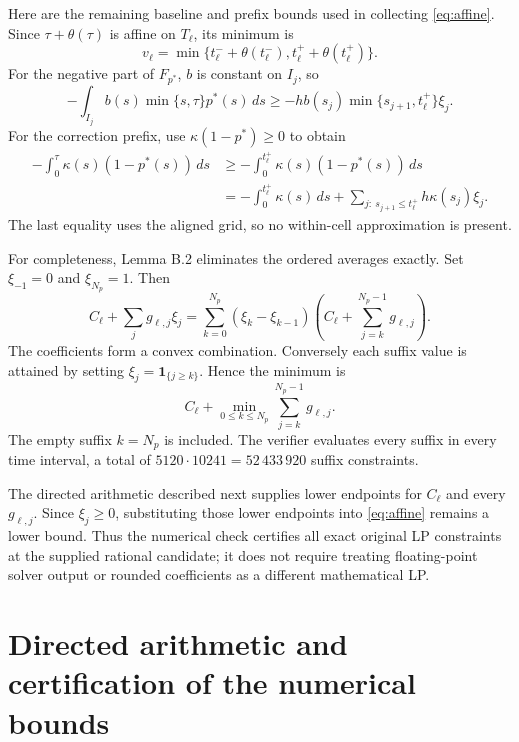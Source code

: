 \documentclass[11pt,a4paper]{article}
\newcommand{\ind}{\mathbf{1}}
\begin{document}
Here are the remaining baseline and prefix bounds used in collecting
\eqref{eq:affine}. Since $\tau+\theta(\tau)$ is affine on $T_\ell$, its
minimum is
\[
 v_\ell=\min\{t_\ell^-+\theta(t_\ell^-),
                  t_\ell^++\theta(t_\ell^+)\}.
\]
For the negative part of $F_{p^*}$, $b$ is constant on $I_j$, so
\[
 -\int_{I_j}b(s)\min\{s,\tau\}p^*(s)\,ds
 \ge -h b(s_j)\min\{s_{j+1},t_\ell^+\}\xi_j.
\]
For the correction prefix, use $\kappa(1-p^*)\ge0$ to obtain
\begin{align*}
 -\int_0^\tau\kappa(s)(1-p^*(s))\,ds
 &\ge-\int_0^{t_\ell^+}\kappa(s)(1-p^*(s))\,ds\\
 &=-\int_0^{t_\ell^+}\kappa(s)\,ds
        +\sum_{j:\ s_{j+1}\le t_\ell^+}h\kappa(s_j)\xi_j.
\end{align*}
The last equality uses the aligned grid, so no within-cell approximation
is present.

For completeness, Lemma B.2 eliminates the ordered averages exactly.
Set $\xi_{-1}=0$ and $\xi_{N_p}=1$. Then
\[
 C_\ell+\sum_j g_{\ell,j}\xi_j
 =\sum_{k=0}^{N_p}(\xi_k-\xi_{k-1})
       \left(C_\ell+\sum_{j=k}^{N_p-1}g_{\ell,j}\right).
\]
The coefficients form a convex combination. Conversely each suffix value
is attained by setting $\xi_j=\ind_{\{j\ge k\}}$. Hence the minimum is
\begin{equation}\label{eq:suffix}
 C_\ell+\min_{0\le k\le N_p}\sum_{j=k}^{N_p-1}g_{\ell,j}.
\end{equation}
The empty suffix $k=N_p$ is included. The verifier evaluates every suffix
in every time interval, a total of $5120\cdot10241=52\,433\,920$
suffix constraints.

The directed arithmetic described next supplies lower endpoints for
$C_\ell$ and every $g_{\ell,j}$. Since $\xi_j\ge0$, substituting those lower
endpoints into \eqref{eq:affine} remains a lower bound. Thus the numerical
check certifies all exact original LP constraints at the supplied rational
candidate; it does not require treating floating-point solver output or
rounded coefficients as a different mathematical LP.


\section{Directed arithmetic and certification of the numerical bounds}
\label{sec:directed-arithmetic}
\end{document}
